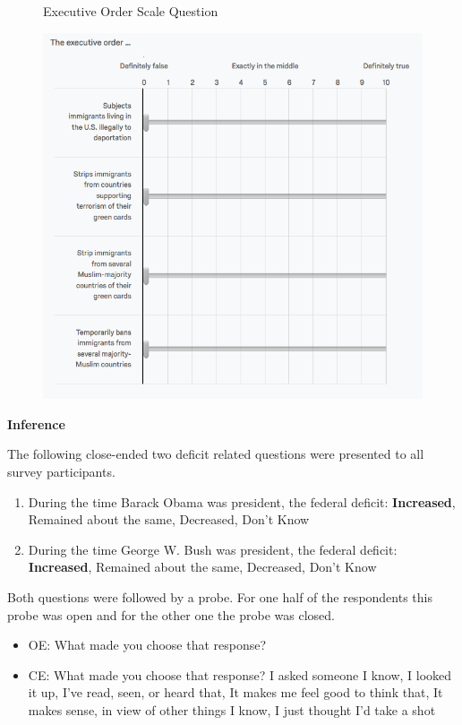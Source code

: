 \begin{center}
	\begin{figure}[H]
		\centering
		\caption{Executive Order Scale Question}
		\includegraphics[width=\textwidth]{../figs/hk_eo1.png}
		\label{fig:eo1}
		\caption*{\footnotesize }
	\end{figure}
\end{center}

\newpage

\noindent
\textbf{Inference}

The following close-ended two deficit related questions were presented to all survey participants.

\begin{enumerate}
	\item During the time Barack Obama was president, the federal deficit: \textbf{Increased}, Remained about the same, Decreased, Don’t Know
	\item During the time George W. Bush was president, the federal deficit: \textbf{Increased}, Remained about the same, Decreased, Don’t Know
\end{enumerate}

Both questions were followed by a probe. For one half of the respondents this probe was open and for the other one the probe was closed.
\begin{itemize}
	\item OE: What made you choose that response?
	\item CE: What made you choose that response? I asked someone I know, I looked it up, I’ve read, seen, or heard that, It makes me feel good to think that, It makes sense, in view of other things I know, I just thought I’d take a shot
\end{itemize}
